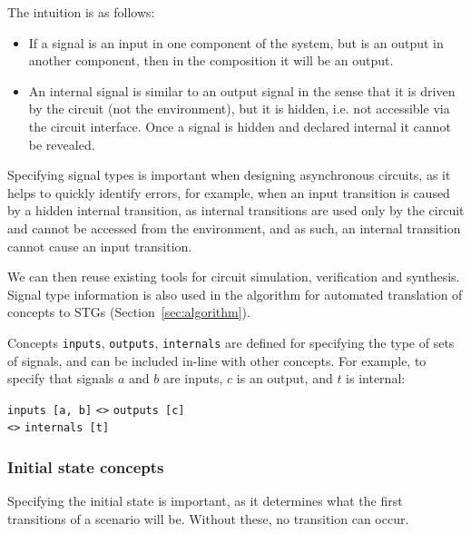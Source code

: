\documentclass[british, 10pt, conference, compsocconf]{IEEEtran}
\begin{document}
The intuition is as follows:

\begin{itemize}
    \item If a signal is an input in one component of the system, but is an
    output in another component, then in the composition it will be an output.
    \item An internal signal is similar to an output signal in the sense
    that it is driven by the circuit (not the environment), but it is hidden, 
    i.e. not accessible via the circuit interface. Once a signal is hidden and 
    declared internal it cannot be revealed.
\end{itemize}

\noindent Specifying signal types is important when designing asynchronous
circuits, as it helps to quickly identify errors, for example, when an input transition is
caused by a hidden internal transition, as internal transitions are used only by the circuit 
and cannot be accessed from the environment, and as such, an internal transition cannot
cause an input transition. 

We can then reuse existing tools for circuit
simulation, verification and synthesis. Signal type information is also used
in the algorithm for automated translation of concepts to
STGs (Section~\ref{sec:algorithm}).

Concepts \texttt{inputs}, \texttt{outputs}, \texttt{internals} are defined for
specifying the type of sets of signals, and can be included in-line
with other concepts. For example, to specify that signals $a$ and $b$ are 
inputs, $c$ is an output, and $t$ is internal:

\vspace{-2mm}

\begin{center}
\texttt{inputs [a, b]} \texttt{<>} \texttt{outputs [c]} \\
\texttt{<>} \texttt{internals [t]}
\end{center}

\vspace{-2mm}

\subsubsection{Initial state concepts\label{sub:initState}}

Specifying the initial state is important, as it determines what the first 
transitions of a scenario will be. Without these, no transition can occur.
\end{document}
